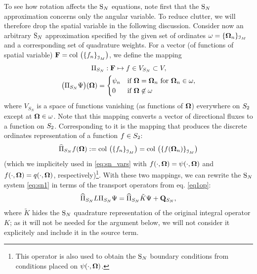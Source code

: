 To see how rotation affects the $\text{S}_{N}$ equations, note first that the $\text{S}_{N}$ approximation concerns only the angular
variable. To reduce clutter, we will therefore drop the spatial variable in the following
discussion.
Consider now an arbitrary $\text{S}_{N}$ approximation specified by the given set of ordinates
$\omega = \{\mathbf{\Omega}_n\}_{\mathcal{I}_{M}}$ and a corresponding set of quadrature weights.
For a vector (of functions of spatial variable) $\mathbf{F} = \operatorname{col\,}\left(\left\{f_n\right\}_{\mathcal{I}_{M}}\right)$, we define the mapping
\begin{equation}\label{eq:map_SN}
\begin{gathered}
\Pi_{S_N}: \mathbf{F} \mapsto f\in V_{S_N}\subset V,\\
\bigl(\Pi_{S_N} \Psi\bigr)(\mathbf{\Omega}) = 
\begin{cases}\displaystyle \psi_n & \mbox{if $\mathbf{\Omega} = \mathbf{\Omega}_n$ for $\mathbf{\Omega}_n \in \omega$},\\ 0 & \mbox{if $\mathbf{\Omega} \not
	\in \omega$} \end{cases}
\end{gathered}
\end{equation}
where $V_{S_N}$ is a space of functions vanishing (as functions of $\mathbf{\Omega}$) everywhere on $S_2$ except at $\mathbf{\Omega}
\in \omega$. Note that this mapping converts a vector of directional fluxes to a function on $S_2$. Corresponding to
it is the mapping that produces the discrete ordinates representation of a function $f\in S_2$: 
\begin{equation}\label{eq:map_SN_inv}
	\widehat\Pi_{S_N} f(\mathbf{\Omega}) := \operatorname{col\,}\left(\left\{f_n \right\}_{\mathcal{I}_{M}}\right)
	 = \operatorname{col\,}\left(\left\{f(\mathbf{\Omega}_n)\right\}_{\mathcal{I}_{M}}\right)
\end{equation}
(which we implicitely used in \eqref{eq:sn_vars} with $f(\cdot,\mathbf{\Omega}) = \psi(\cdot,\mathbf{\Omega})$ and
$f(\cdot,\mathbf{\Omega}) = q(\cdot,\mathbf{\Omega})$, respectively)\footnote{This operator is also used to obtain the $\text{S}_{N}$ boundary
conditions from conditions placed on $\psi(\cdot,\mathbf{\Omega})$.}.
With these two mappings, we can rewrite the $\text{S}_{N}$ system \eqref{eq:sn1} in terms of the transport operators from eq.
\eqref{eq1op}:
\begin{equation}\label{eq:sn_op}
	\widehat\Pi_{S_N} L\Pi_{S_N} \Psi = \widehat\Pi_{S_N}\tilde K\Psi + \mathbf{Q}_{S_N},
\end{equation}
where $\tilde K$ hides the $\text{S}_{N}$ quadrature representation of the original integral operator $K$; as it
will not be needed for the argument below, we will not consider it explicitely and include it in the source term.

